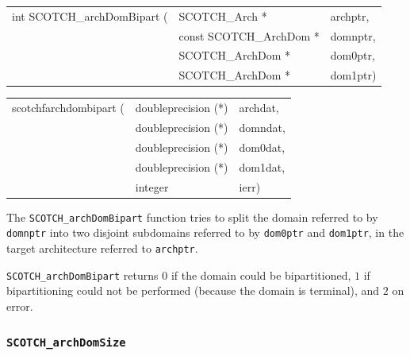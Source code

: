 \begin{itemize}
\progsyn

{\tt\begin{tabular}{l@{}ll}
int SCOTCH\_archDomBipart ( & SCOTCH\_Arch *          & archptr, \\
                            & const SCOTCH\_ArchDom * & domnptr, \\
                            & SCOTCH\_ArchDom *       & dom0ptr, \\
                            & SCOTCH\_ArchDom *       & dom1ptr) \\
\end{tabular}}

{\tt\begin{tabular}{l@{}ll}
scotchfarchdombipart ( & doubleprecision (*) & archdat, \\
                       & doubleprecision (*) & domndat, \\
                       & doubleprecision (*) & dom0dat, \\
                       & doubleprecision (*) & dom1dat, \\
                       & integer             & ierr)
\end{tabular}}

\progdes

The {\tt SCOTCH\_archDomBipart} function tries to split the domain
referred to by {\tt domnptr} into two disjoint subdomains referred to
by {\tt dom0ptr} and {\tt dom1ptr}, in the target architecture
referred to {\tt archptr}.

\progret

{\tt SCOTCH\_archDomBipart} returns $0$ if the domain could be
bipartitioned, $1$ if bipartitioning could not be performed (because
the domain is terminal), and $2$ on error.
\end{itemize}

\subsubsection{{\tt SCOTCH\_archDomSize}}

